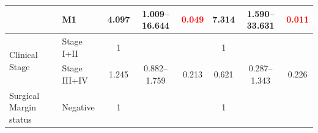 \documentclass[
paper=landscape,
paper=160mm:90mm, %
fontsize=11pt, %
pagesize, %
parskip=half-, %
]{scrartcl} %
\theoremstyle{mythmstyle} %
\begin{document}
\begin{table}[H]
{\begin{tabular}{|l|l|c|c|c|c|c|c|}
\cline{2-8}
                                        & M1                                                                                  & 4.097                                                                          & 1.009--16.644                                                                  & \textcolor{red}{0.049}                                                        & 7.314                                                                          & 1.590--33.631                                                                  & \textcolor{red}{0.011}                                                         \\ 
\hline
\multirow{2}{*}{Clinical Stage}         & {\cellcolor[rgb]{0.62,0.812,0.878}}Stage I+II                                       & {\cellcolor[rgb]{0.62,0.812,0.878}}1                                           & {\cellcolor[rgb]{0.62,0.812,0.878}}                                           & {\cellcolor[rgb]{0.62,0.812,0.878}}                                           & {\cellcolor[rgb]{0.62,0.812,0.878}}1                                           & {\cellcolor[rgb]{0.62,0.812,0.878}}                                           & {\cellcolor[rgb]{0.62,0.812,0.878}}                                            \\ 
\cline{2-8}
                                        & Stage III+IV                                                                        & 1.245                                                                          & 0.882--1.759                                                                   & 0.213                                                                         & 0.621                                                                          & 0.287--1.343                                                                   & 0.226                                                                          \\ 
\hline
\multirow{2}{*}{Surgical Margin status} & {\cellcolor[rgb]{0.62,0.812,0.878}}Negative                                         & {\cellcolor[rgb]{0.62,0.812,0.878}}1                                           & {\cellcolor[rgb]{0.62,0.812,0.878}}                                           & {\cellcolor[rgb]{0.62,0.812,0.878}}                                           & {\cellcolor[rgb]{0.62,0.812,0.878}}1                                           & {\cellcolor[rgb]{0.62,0.812,0.878}}                                           & {\cellcolor[rgb]{0.62,0.812,0.878}}                                            \\ 

\end{tabular}}
\end{table}
\end{document}
